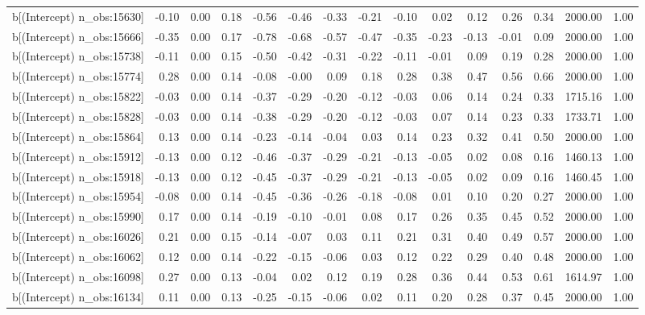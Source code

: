 \begin{table}[ht]
\begin{tabular}{rrrrrrrrrrrrrrr}
  b[(Intercept) n\_obs:15630] & -0.10 & 0.00 & 0.18 & -0.56 & -0.46 & -0.33 & -0.21 & -0.10 & 0.02 & 0.12 & 0.26 & 0.34 & 2000.00 & 1.00 \\ 
  b[(Intercept) n\_obs:15666] & -0.35 & 0.00 & 0.17 & -0.78 & -0.68 & -0.57 & -0.47 & -0.35 & -0.23 & -0.13 & -0.01 & 0.09 & 2000.00 & 1.00 \\ 
  b[(Intercept) n\_obs:15738] & -0.11 & 0.00 & 0.15 & -0.50 & -0.42 & -0.31 & -0.22 & -0.11 & -0.01 & 0.09 & 0.19 & 0.28 & 2000.00 & 1.00 \\ 
  b[(Intercept) n\_obs:15774] & 0.28 & 0.00 & 0.14 & -0.08 & -0.00 & 0.09 & 0.18 & 0.28 & 0.38 & 0.47 & 0.56 & 0.66 & 2000.00 & 1.00 \\ 
  b[(Intercept) n\_obs:15822] & -0.03 & 0.00 & 0.14 & -0.37 & -0.29 & -0.20 & -0.12 & -0.03 & 0.06 & 0.14 & 0.24 & 0.33 & 1715.16 & 1.00 \\ 
  b[(Intercept) n\_obs:15828] & -0.03 & 0.00 & 0.14 & -0.38 & -0.29 & -0.20 & -0.12 & -0.03 & 0.07 & 0.14 & 0.23 & 0.33 & 1733.71 & 1.00 \\ 
  b[(Intercept) n\_obs:15864] & 0.13 & 0.00 & 0.14 & -0.23 & -0.14 & -0.04 & 0.03 & 0.14 & 0.23 & 0.32 & 0.41 & 0.50 & 2000.00 & 1.00 \\ 
  b[(Intercept) n\_obs:15912] & -0.13 & 0.00 & 0.12 & -0.46 & -0.37 & -0.29 & -0.21 & -0.13 & -0.05 & 0.02 & 0.08 & 0.16 & 1460.13 & 1.00 \\ 
  b[(Intercept) n\_obs:15918] & -0.13 & 0.00 & 0.12 & -0.45 & -0.37 & -0.29 & -0.21 & -0.13 & -0.05 & 0.02 & 0.09 & 0.16 & 1460.45 & 1.00 \\ 
  b[(Intercept) n\_obs:15954] & -0.08 & 0.00 & 0.14 & -0.45 & -0.36 & -0.26 & -0.18 & -0.08 & 0.01 & 0.10 & 0.20 & 0.27 & 2000.00 & 1.00 \\ 
  b[(Intercept) n\_obs:15990] & 0.17 & 0.00 & 0.14 & -0.19 & -0.10 & -0.01 & 0.08 & 0.17 & 0.26 & 0.35 & 0.45 & 0.52 & 2000.00 & 1.00 \\ 
  b[(Intercept) n\_obs:16026] & 0.21 & 0.00 & 0.15 & -0.14 & -0.07 & 0.03 & 0.11 & 0.21 & 0.31 & 0.40 & 0.49 & 0.57 & 2000.00 & 1.00 \\ 
  b[(Intercept) n\_obs:16062] & 0.12 & 0.00 & 0.14 & -0.22 & -0.15 & -0.06 & 0.03 & 0.12 & 0.22 & 0.29 & 0.40 & 0.48 & 2000.00 & 1.00 \\ 
  b[(Intercept) n\_obs:16098] & 0.27 & 0.00 & 0.13 & -0.04 & 0.02 & 0.12 & 0.19 & 0.28 & 0.36 & 0.44 & 0.53 & 0.61 & 1614.97 & 1.00 \\ 
  b[(Intercept) n\_obs:16134] & 0.11 & 0.00 & 0.13 & -0.25 & -0.15 & -0.06 & 0.02 & 0.11 & 0.20 & 0.28 & 0.37 & 0.45 & 2000.00 & 1.00 \\ 

\end{tabular}
\end{table}
